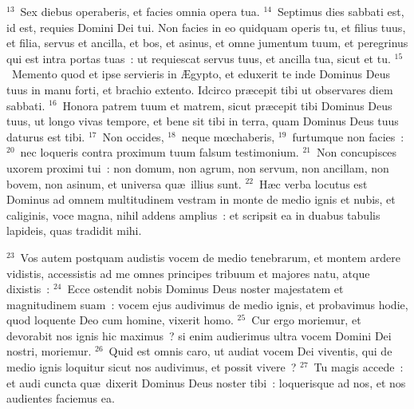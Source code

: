 ${}^{13}$~Sex diebus operaberis, et facies omnia opera tua.
${}^{14}$~Septimus dies sabbati est, id est, requies Domini Dei tui. Non facies in eo quidquam operis tu, et filius tuus, et filia, servus et ancilla, et bos, et asinus, et omne jumentum tuum, et peregrinus qui est intra portas tuas~: ut requiescat servus tuus, et ancilla tua, sicut et tu.
${}^{15}$~Memento quod et ipse servieris in \AE gypto, et eduxerit te inde Dominus Deus tuus in manu forti, et brachio extento. Idcirco pr\ae cepit tibi ut observares diem sabbati.
${}^{16}$~Honora patrem tuum et matrem, sicut pr\ae cepit tibi Dominus Deus tuus, ut longo vivas tempore, et bene sit tibi in terra, quam Dominus Deus tuus daturus est tibi.
${}^{17}$~Non occides,
${}^{18}$~neque mœchaberis,
${}^{19}$~furtumque non facies~:
${}^{20}$~nec loqueris contra proximum tuum falsum testimonium.
${}^{21}$~Non concupisces uxorem proximi tui~: non domum, non agrum, non servum, non ancillam, non bovem, non asinum, et universa qu\ae\ illius sunt.
${}^{22}$~H\ae c verba locutus est Dominus ad omnem multitudinem vestram in monte de medio ignis et nubis, et caliginis, voce magna, nihil addens amplius~: et scripsit ea in duabus tabulis lapideis, quas tradidit mihi.


${}^{23}$~Vos autem postquam audistis vocem de medio tenebrarum, et montem ardere vidistis, accessistis ad me omnes principes tribuum et majores natu, atque dixistis~:
${}^{24}$~Ecce ostendit nobis Dominus Deus noster majestatem et magnitudinem suam~: vocem ejus audivimus de medio ignis, et probavimus hodie, quod loquente Deo cum homine, vixerit homo.
${}^{25}$~Cur ergo moriemur, et devorabit nos ignis hic maximus~? si enim audierimus ultra vocem Domini Dei nostri, moriemur.
${}^{26}$~Quid est omnis caro, ut audiat vocem Dei viventis, qui de medio ignis loquitur sicut nos audivimus, et possit vivere~?
${}^{27}$~Tu magis accede~: et audi cuncta qu\ae\ dixerit Dominus Deus noster tibi~: loquerisque ad nos, et nos audientes faciemus ea.


